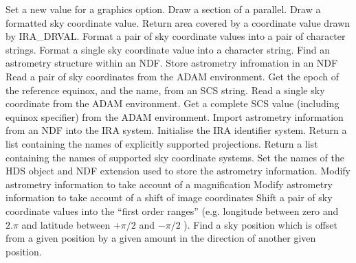   {Set a new value for a graphics option.}
   {Draw a section of a parallel.}
   {Draw a formatted sky coordinate value.}
   {Return area covered by a coordinate value drawn by IRA\_DRVAL.}
   {Format a  pair of sky coordinate values into a pair of character strings.}
   {Format a  single sky coordinate value into a character string.}
   {Find an astrometry structure within an NDF.}
   {Store astrometry infromation in an NDF}
   {Read a pair of sky coordinates from the ADAM environment.}
   {Get the epoch of the reference equinox, and the name, from an SCS string.}
   {Read a single sky coordinate from the ADAM environment.}
   {Get a complete SCS value (including equinox specifier) from the ADAM
    environment.}
   {Import astrometry information from an NDF into the IRA system.}
   {Initialise the IRA identifier system.}
   {Return a list containing the names of explicitly supported projections.}
   {Return a list containing the names of supported sky coordinate systems.}
   {Set the names of the HDS object and NDF extension used to store the
   astrometry information.}
   {Modify astrometry information to take account of a magnification}
   {Modify astrometry information to take account of a shift of image
coordinates}
   {Shift a pair of sky coordinate values into the ``first order ranges'' (e.g.
   longitude between zero and $2.\pi$ and latitude between $+\pi/2$ and
   $-\pi/2$ ).}
   {Find a sky position which is offset from a given position by a given
   amount in the direction of another given position.}
